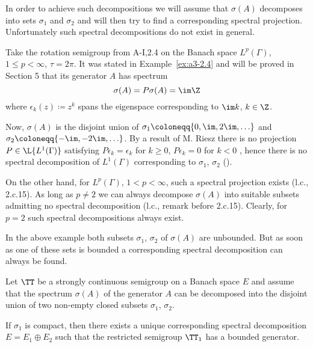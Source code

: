 In order to achieve such decompositions we will assume that $\sigma(A)$ decomposes into sets $\sigma_{1}$ and $\sigma_{2}$ and will then try to find a corresponding spectral projection.
Unfortunately such spectral decompositions do not exist in general.
\begin{example}\label{ex:a3-3.2}
Take the rotation semigroup from A-I,2.4 on the Banach space $L^{p}(\Gamma)$, $1 \leq p < \infty$, $\tau = 2\pi$.
It was stated in Example~\ref{ex:a3-2.4} and will be proved in Section 5 that its generator $A$ has spectrum
\[
\sigma(A) = P\sigma(A) = \im\Z
\]
where $\epsilon_{k}(z) \coloneqq z^{k}$ spans the eigenspace corresponding to $\im k$, $k \in \Z$.

Now, $\sigma(A)$ is the disjoint union of 
$\sigma_{1} \coloneqq \{0,\im ,2\im, \ldots\}$ 
and $\sigma_{2} \coloneqq \{-\im, -2\im, \ldots\}$.
By a result of M. Riesz there is no projection $P \in \L{L^{1}(\Gamma)}$ satisfying $P\epsilon_{k} = \epsilon_{k}$ for $k \geq 0$, $P\epsilon_{k} = 0$ for $k < 0$ , hence there is no spectral decomposition of $L^{1}(\Gamma)$ corresponding to $\sigma_{1}$, $\sigma_{2}$ (\citet[p.165]{lindenstraustzafriri:1979}).

On the other hand, for $L^{p}(\Gamma)$, $1 < p < \infty$, such a spectral projection exists (l.c., 2.c.15).
As long as $p \neq 2$ we can always decompose $\sigma(A)$ into suitable subsets admitting no spectral decomposition (l.c., remark before 2.c.15).
Clearly, for $p = 2$ such spectral decompositions always exist.
\end{example}
In the above example both subsets $\sigma_{1}$, $\sigma_{2}$ of $\sigma(A)$ are unbounded.
But as soon as one of these sets is bounded a corresponding spectral decomposition can always be found.
\begin{theorem}\label{thm:a3-3.3}
Let $\TT$ be a strongly continuous semigroup on a Banach space $E$ and assume that the spectrum $\sigma(A)$ of the generator $A$ can be decomposed into the disjoint union of two non-empty closed subsets $\sigma_{1}$, $\sigma_{2}$.

If $\sigma_{1}$ is compact, then there exists a unique corresponding spectral decomposition $E = E_{1} \oplus E_{2}$ such that the restricted semigroup $\TT_{1}$ has a bounded generator.
\end{theorem}
